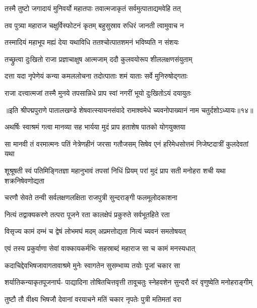 \twolineshloka
{तस्मै तुष्टो जगादायं मुनिवर्यो महातपाः}
{तवात्मजाकृतं सर्वमुत्पाताद्यमवेहि तत्}%

\twolineshloka
{तव पुत्र्या महाराज चक्षुर्विस्फोटनं कृतम्}
{बहुसुस्राव रुधिरं जानती त्वामुवाच न}%

\twolineshloka
{तस्मादियं महाभूप मह्यं देया यथाविधि}
{ततश्चोत्पातशमनं भविष्यति न संशयः}%

\twolineshloka
{तच्छ्रुत्वा दुःखितो राजा प्रज्ञाचाक्षुष आत्मजाम्}
{ददौ कुलवयोरूप शीललक्षणसंयुताम्}%

\twolineshloka
{दत्ता यदा नृपेणेयं कन्या कमललोचना}
{तदोत्पाताः शमं याताः सर्वे मुनिरुषोद्गताः}%

\twolineshloka
{राजा दत्त्वात्मजां तस्मै मुनये तपसान्निधे}
{प्राप स्वां नगरीं भूयो दुःखितोऽयं दयायुतः}%

{॥इति श्रीपद्मपुराणे पातालखण्डे शेषवात्स्यायनसंवादे रामाश्वमेधे च्यवनोपाख्यानं नाम चतुर्दशोऽध्यायः॥१४॥}

\resetShloka


\twolineshloka
{अथर्षिः स्वाश्रमं गत्वा मानव्या सह भार्यया}
{मुदं प्राप हताशेष पातको योगयुक्तया}%

\fourlineindentedshloka
{सा मानवी तं वरमात्मनः पतिं}
{नेत्रेणहीनं जरसा गतौजसम्}
{सिषेव एनं हरिमेधसोत्तमं}
{निजेष्टदात्रीं कुलदेवतां यथा}%

\fourlineindentedshloka
{शूश्रूषती स्वं पतिमिङ्गितज्ञा}
{महानुभावं तपसां निधिं प्रियम्}
{परां मुदं प्राप सती मनोहरा}
{शची यथा शक्रनिषेवणोद्यता}%

\twolineshloka
{चरणौ सेवते तन्वी सर्वलक्षणलक्षिता}
{राजपुत्री सुन्दराङ्गी फलमूलोदकाशना}%

\twolineshloka
{नित्यं तद्वाक्यकरणे तत्परा पूजने रता}
{कालक्षेपं प्रकुरुते सर्वभूतहिते रता}%

\twolineshloka
{विसृज्य कामं दम्भं च द्वेषं लोभमघं मदम्}
{अप्रमत्तोद्यता नित्यं च्यवनं समतोषयत्}%

\twolineshloka
{एवं तस्य प्रकुर्वाणा सेवां वाक्कायकर्मभिः}
{सहस्राब्दं महाराज सा च कामं मनस्यधात्}%

\twolineshloka
{कदाचिद्देवभिषजावागतावाश्रमे मुनेः}
{स्वागतेन सुसम्भाव्य तयोः पूजां चकार सा}%

\fourlineindentedshloka
{शर्यातिकन्याकृतपूजनार्घ-}
{पाद्यादिना तोषितचित्तवृत्ती}
{तावूचतुः स्नेहवशेन सुन्दरौ}
{वरं वृणुष्वेति मनोहराङ्गीम्}%

\twolineshloka
{तुष्टौ तौ वीक्ष्य भिषजौ देवानां वरयाचने}
{मतिं चकार नृपतेः पुत्री मतिमतां वरा}%

